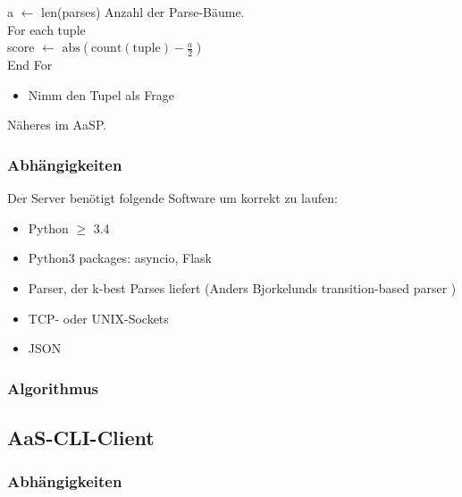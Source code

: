 \documentclass{scrartcl}
\begin{document}
        \indent\indent\indent\indent\indent\indent a $\gets$ len(parses) Anzahl der Parse-Bäume. \\
        \indent\indent\indent\indent\indent\indent For each tuple \\
       \indent\indent\indent\indent\indent\indent\indent score $\gets$ $\mathrm{abs}(\mathrm{count(tuple)} - \frac{a}{2})$ \\
        \indent\indent\indent\indent\indent\indent End For

    \begin{itemize}
        \item Nimm den Tupel als Frage
    \end{itemize}
Näheres im AaSP.

\subsubsection{Abhängigkeiten}
\label{ssub:Server-Abhaengigkeiten}
Der Server benötigt folgende Software um korrekt zu laufen:
    \begin{itemize}
        \item Python $\geq$ 3.4 
        \item Python3 packages: asyncio, Flask
        \item Parser, der k-best Parses liefert (Anders Bjorkelunds transition-based parser )
        \item TCP- oder UNIX-Sockets
        \item JSON
    \end{itemize}

\subsubsection{Algorithmus}
\label{ssub:Algorithmus}

\subsection{AaS-CLI-Client}
\label{sub:AaS-CLI-Client}

\subsubsection{Abhängigkeiten}
\label{ssub:CLI-Client-Abhaengigkeiten}
\end{document}
